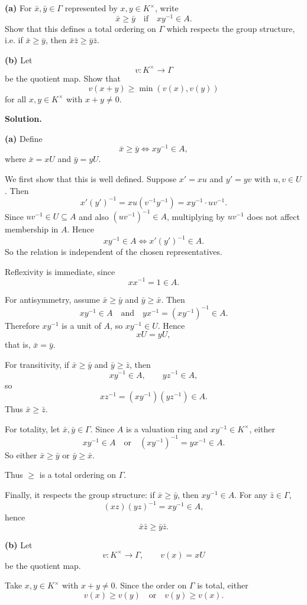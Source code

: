 \documentclass[12pt,a4paper]{article}
\theoremstyle{plain}
\theoremstyle{definition}      %
\begin{document}
\textbf{(a)} For \(\bar x,\bar y\in \Gamma\) represented by \(x,y\in K^\times\), write
\[
\bar x\ge \bar y \quad\text{if}\quad xy^{-1}\in A.
\]
Show that this defines a total ordering on \(\Gamma\) which respects the group structure, i.e. if \(\bar x\ge \bar y\), then \(\bar x\bar z\ge \bar y\bar z\).

\textbf{(b)} Let
\[
v:K^\times\to \Gamma
\]
be the quotient map. Show that
\[
v(x+y)\ge \min(v(x),v(y))
\]
for all \(x,y\in K^\times\) with \(x+y\neq 0\).

\textbf{Solution.}

\textbf{(a)} Define
\[
\bar x\ge \bar y \iff xy^{-1}\in A,
\]
where \(\bar x=xU\) and \(\bar y=yU\).

We first show that this is well defined. Suppose \(x'=xu\) and \(y'=yv\) with \(u,v\in U\). Then
\[
x'(y')^{-1}=xu(v^{-1}y^{-1})=xy^{-1}\cdot uv^{-1}.
\]
Since \(uv^{-1}\in U\subseteq A\) and also \((uv^{-1})^{-1}\in A\), multiplying by \(uv^{-1}\) does not affect membership in \(A\). Hence
\[
xy^{-1}\in A \iff x'(y')^{-1}\in A.
\]
So the relation is independent of the chosen representatives.

Reflexivity is immediate, since
\[
xx^{-1}=1\in A.
\]

For antisymmetry, assume \(\bar x\ge \bar y\) and \(\bar y\ge \bar x\). Then
\[
xy^{-1}\in A
\quad\text{and}\quad
yx^{-1}=(xy^{-1})^{-1}\in A.
\]
Therefore \(xy^{-1}\) is a unit of \(A\), so \(xy^{-1}\in U\). Hence
\[
xU=yU,
\]
that is, \(\bar x=\bar y\).

For transitivity, if \(\bar x\ge \bar y\) and \(\bar y\ge \bar z\), then
\[
xy^{-1}\in A,\qquad yz^{-1}\in A,
\]
so
\[
xz^{-1}=(xy^{-1})(yz^{-1})\in A.
\]
Thus \(\bar x\ge \bar z\).

For totality, let \(\bar x,\bar y\in \Gamma\). Since \(A\) is a valuation ring and \(xy^{-1}\in K^\times\), either
\[
xy^{-1}\in A
\quad\text{or}\quad
(xy^{-1})^{-1}=yx^{-1}\in A.
\]
So either \(\bar x\ge \bar y\) or \(\bar y\ge \bar x\).

Thus \(\ge\) is a total ordering on \(\Gamma\).

Finally, it respects the group structure: if \(\bar x\ge \bar y\), then \(xy^{-1}\in A\). For any \(\bar z\in \Gamma\),
\[
(xz)(yz)^{-1}=xy^{-1}\in A,
\]
hence
\[
\bar x\bar z\ge \bar y\bar z.
\]

\medskip

\textbf{(b)} Let
\[
v:K^\times\to \Gamma,\qquad v(x)=xU
\]
be the quotient map.

Take \(x,y\in K^\times\) with \(x+y\neq 0\). Since the order on \(\Gamma\) is total, either
\[
v(x)\ge v(y)
\quad\text{or}\quad
v(y)\ge v(x).
\]
\end{document}

